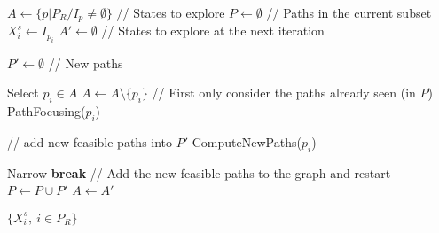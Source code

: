 \STATE $A \gets \{p | P_R / I_p \neq \emptyset\}$ // States to explore
\STATE $P \gets \emptyset$ // Paths in the current subset
	\STATE $X_i^s \gets I_{p_i}$ \label{alg=X-init}
\ENDFOR 
{}
\STATE $A' \gets \emptyset$ // States to explore at the next iteration

\STATE $P' \gets \emptyset$ // New paths

 \label{alg=start-ascending}
	\STATE Select $p_i \in A$
	\STATE $A \gets A \setminus \{p_i\}$
	\STATE // First only consider the paths already seen (in $P$)
	\STATE PathFocusing($p_i$) \label{alg=pf}
	
	\STATE // add new feasible paths into $P'$
	\STATE ComputeNewPaths($p_i$) \label{alg=computeNewPaths}

\ENDWHILE \label{alg=end-ascending}
\STATE Narrow \label{alg=narrowing}
	\STATE \textbf{break}
\ENDIF 
\STATE // Add the new feasible paths to the graph and restart  \label{alg=start-add-paths}
\STATE $P \gets P \cup P'$
\STATE $A \gets A'$ \label{alg=end-add-paths}
\ENDWHILE

\STATE \RETURN $\{X_i^s,\ i \in P_R\}$

